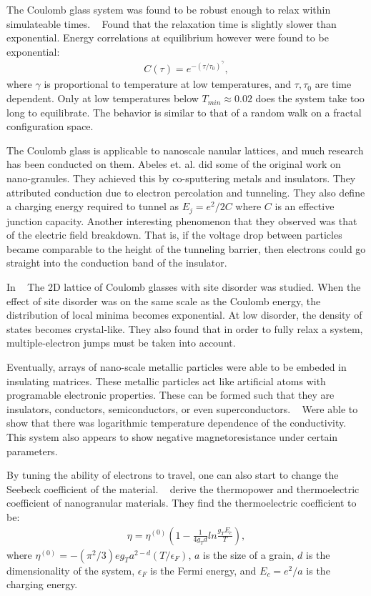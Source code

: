 The Coulomb glass system was found to be robust enough to relax within simulateable times. ~\cite{Kirkengen09} Found that the relaxation time is slightly slower than exponential. Energy correlations at equilibrium however were found to be exponential:
\begin{eqnarray}
C(\tau) = e^{-(\tau / \tau_0)^\gamma},
\label{correlations}
\end{eqnarray}
where $\gamma$ is proportional to temperature at low temperatures, and $\tau , \tau_0$ are time dependent. Only at low temperatures below $T_{min} \approx 0.02$ does the system take too long to equilibrate. The behavior is similar to that of a random walk on a fractal configuration space. 

The Coulomb glass is applicable to nanoscale nanular lattices, and much research has been conducted on them. Abeles et. al. did some of the original work on nano-granules. They achieved this by co-sputtering metals and insulators. They attributed conduction due to electron percolation and tunneling. They also define a charging energy required to tunnel as $E_j = e^2/2C$ where $C$ is an effective junction capacity. Another interesting phenomenon that they observed was that of the electric field breakdown. That is, if the voltage drop between particles became comparable to the height of the tunneling barrier, then electrons could go straight into the conduction band of the insulator. 

In ~\cite{Vinokur08} The 2D lattice of Coulomb glasses with site disorder was studied. When the effect of site disorder was on the same scale as the Coulomb energy, the distribution of local minima becomes exponential. At low disorder, the density of states becomes crystal-like. They also found that in order to fully relax a system, multiple-electron jumps must be taken into account. 

Eventually, arrays of nano-scale metallic particles were able to be embeded in insulating matrices. These metallic particles act like artificial atoms with programable electronic properties. These can be formed such that they are insulators, conductors, semiconductors, or even superconductors. ~\cite{Beloborodov07}  Were able to show that there was logarithmic temperature dependence of the conductivity. This system also appears to show negative magnetoresistance under certain parameters. 

By tuning the ability of electrons to travel, one can also start to change the Seebeck coefficient of the material. ~\cite{Glatz09} derive the thermopower and thermoelectric coefficient of nanogranular materials. They find the thermoelectric coefficient to be:
\begin{eqnarray}
\eta = \eta^{(0)} (1 - \frac{1} {4 g_T d} ln \frac{g_T E_c} {T} ),
\label{thermoelectric}
\end{eqnarray}
where $\eta^{(0)} = -(\pi^2 / 3) e g_T a^{2-d} (T/ \epsilon_F)$, $a$ is the size of a grain, $d$ is the dimensionality of the system, $\epsilon_F$ is the Fermi energy, and $E_c = e^2 /a$ is the charging energy. 


